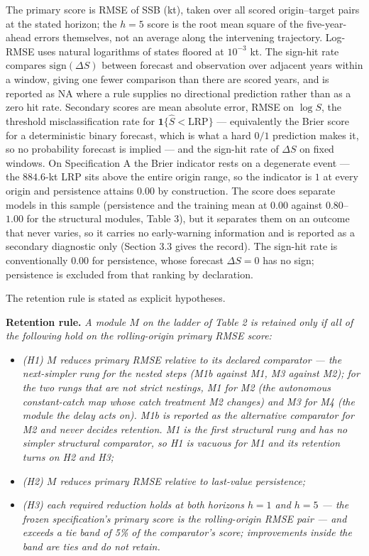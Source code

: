 \documentclass[11pt]{article}
\providecommand{\tightlist}{\setlength{\itemsep}{0pt}\setlength{\parskip}{0pt}}
\begin{document}
The primary score is RMSE of SSB (kt), taken over all scored
origin--target pairs at the stated horizon; the \(h=5\) score is the
root mean square of the five-year-ahead errors themselves, not an
average along the intervening trajectory. Log-RMSE uses natural
logarithms of states floored at \(10^{-3}\) kt. The sign-hit rate
compares \(\mathrm{sign}(\Delta S)\) between forecast and observation
over adjacent years within a window, giving one fewer comparison than
there are scored years, and is reported as NA where a rule supplies no
directional prediction rather than as a zero hit rate. Secondary scores are mean
absolute error, RMSE on \(\log S\), the threshold misclassification
rate for \(\mathbf{1}\{\hat S<\mathrm{LRP}\}\) --- equivalently the
Brier score for a deterministic binary forecast, which is what a hard
\(0/1\) prediction makes it, so no probability forecast is implied ---
and the sign-hit rate of \(\Delta S\) on fixed windows. On Specification A the Brier indicator
rests on a degenerate event --- the \(884.6\)-kt LRP sits above the
entire origin range, so the indicator is \(1\) at every origin and
persistence attains \(0.00\) by construction. The score does separate
models in this sample (persistence and the training mean at \(0.00\)
against \(0.80\)--\(1.00\) for the structural modules, Table 3), but it
separates them on an outcome that never varies, so it carries no
early-warning information and is reported as a secondary diagnostic only
(Section 3.3 gives the record). The
sign-hit rate is conventionally \(0.00\) for persistence, whose forecast
\(\Delta S = 0\) has no sign; persistence is excluded from that ranking
by declaration.

The retention rule is stated as explicit hypotheses.

\textbf{Retention rule.} \emph{A module \(M\) on the ladder of Table 2
is retained only if all of the following hold on the rolling-origin
primary RMSE score:}

\begin{itemize}
\tightlist
\item
  \emph{(H1) \(M\) reduces primary RMSE relative to its declared
  comparator --- the next-simpler rung for the nested steps (M1b against
  M1, M3 against M2); for the two rungs that are not strict nestings, M1
  for M2 (the autonomous constant-catch map whose catch treatment M2
  changes) and M3 for M4 (the module the delay acts on). M1b is reported
  as the alternative comparator for M2 and never decides retention. M1
  is the first structural rung and has no simpler structural comparator,
  so H1 is vacuous for M1 and its retention turns on H2 and H3;}
\item
  \emph{(H2) \(M\) reduces primary RMSE relative to last-value
  persistence;}
\item
  \emph{(H3) each required reduction holds at both horizons \(h=1\) and
  \(h=5\) --- the frozen specification's primary score is the
  rolling-origin RMSE pair --- and exceeds a tie band of 5\% of the
  comparator's score; improvements inside the band are ties and do not
  retain.}
\end{itemize}
\end{document}
